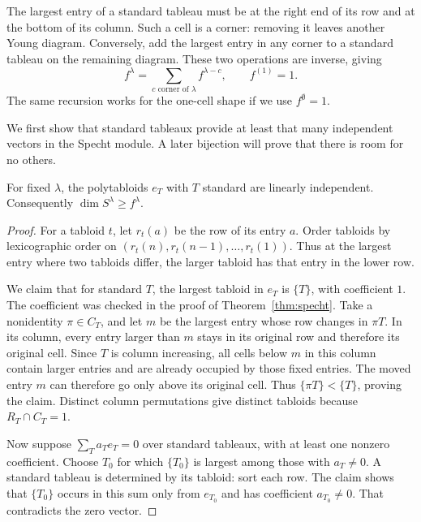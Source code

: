 The largest entry of a standard tableau must be at the right end of its row and at the bottom of its column. Such a cell is a corner: removing it leaves another Young diagram. Conversely, add the largest entry in any corner to a standard tableau on the remaining diagram. These two operations are inverse, giving
\begin{equation}\label{eq:frecur}
f^\lambda=\sum_{c\text{ corner of }\lambda}f^{\lambda-c},
\qquad f^{(1)}=1.
\end{equation}
The same recursion works for the one-cell shape if we use $f^\emptyset=1$.

We first show that standard tableaux provide at least that many independent vectors in the Specht module. A later bijection will prove that there is room for no others.

\begin{theorem}\label{thm:standardbasis}
For fixed $\lambda$, the polytabloids $e_T$ with $T$ standard are linearly independent. Consequently $\dim S^\lambda\ge f^\lambda$.
\end{theorem}

\begin{proof}
For a tabloid $t$, let $r_t(a)$ be the row of its entry $a$. Order tabloids by lexicographic order on
$(r_t(n),r_t(n-1),\ldots,r_t(1))$.
Thus at the largest entry where two tabloids differ, the larger tabloid has that entry in the lower row.

We claim that for standard $T$, the largest tabloid in $e_T$ is $\{T\}$, with coefficient $1$. The coefficient was checked in the proof of Theorem~\ref{thm:specht}. Take a nonidentity $\pi\in C_T$, and let $m$ be the largest entry whose row changes in $\pi T$. In its column, every entry larger than $m$ stays in its original row and therefore its original cell. Since $T$ is column increasing, all cells below $m$ in this column contain larger entries and are already occupied by those fixed entries. The moved entry $m$ can therefore go only above its original cell. Thus $\{\pi T\}<\{T\}$, proving the claim. Distinct column permutations give distinct tabloids because $R_T\cap C_T=1$.

Now suppose $\sum_Ta_Te_T=0$ over standard tableaux, with at least one nonzero coefficient. Choose $T_0$ for which $\{T_0\}$ is largest among those with $a_T\ne0$. A standard tableau is determined by its tabloid: sort each row. The claim shows that $\{T_0\}$ occurs in this sum only from $e_{T_0}$ and has coefficient $a_{T_0}\ne0$. That contradicts the zero vector.
\end{proof}

